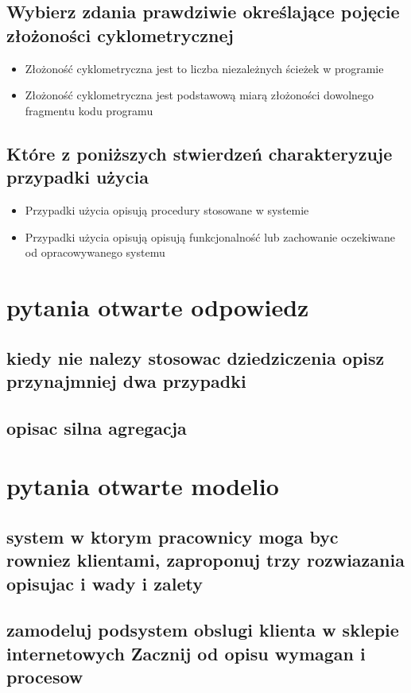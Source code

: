 \documentclass[11pt]{article}
\begin{document}
\subsection{Wybierz zdania prawdziwie określające pojęcie złożoności cyklometrycznej}
\label{sec:org93b9a4e}
\begin{itemize}
\item Złożoność cyklometryczna jest to liczba niezależnych ścieżek w programie
\item Złożoność cyklometryczna jest podstawową miarą złożoności dowolnego fragmentu kodu programu
\end{itemize}
\subsection{Które z poniższych stwierdzeń charakteryzuje przypadki użycia}
\label{sec:orgd6f4920}
\begin{itemize}
\item Przypadki użycia opisują procedury stosowane w systemie
\item Przypadki użycia opisują opisują funkcjonalność lub zachowanie oczekiwane od opracowywanego systemu
\end{itemize}
\section{pytania otwarte odpowiedz}
\label{sec:orgfd6f683}
\subsection{kiedy nie nalezy stosowac dziedziczenia opisz przynajmniej dwa przypadki}
\label{sec:org18e84a5}
\subsection{opisac silna agregacja}
\label{sec:org14c9d6b}
\section{pytania otwarte modelio}
\label{sec:org390b7c1}
\subsection{system w ktorym pracownicy moga byc rowniez klientami, zaproponuj trzy rozwiazania opisujac i wady i zalety}
\label{sec:org3d0d1df}
\subsection{zamodeluj podsystem obslugi klienta w sklepie internetowych Zacznij od opisu wymagan i procesow}
\label{sec:org2ed9c9d}
\end{document}

